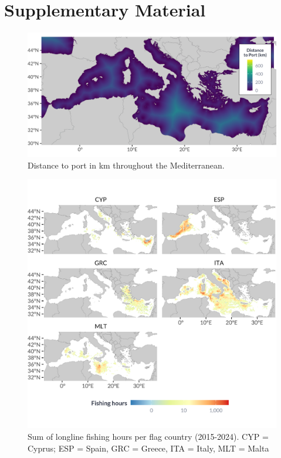 \chapter{Supplementary Material}

\begin{figure}[H]
	\centering
	\includegraphics[width=1\linewidth, trim=0 0 0 0,clip]{Figures/plots/dist_med.pdf}
	\caption{Distance to port in km throughout the Mediterranean. }
	\label{fig:distance}
\end{figure}

\begin{figure}[H]
	\centering
	\includegraphics[width=1\linewidth, trim=0 1.2cm 0 1.2cm,clip]{Figures/plots/longline_countries.pdf}
	\caption{Sum of longline fishing hours per flag country (2015-2024). CYP = Cyprus; ESP = Spain, GRC = Greece, ITA = Italy, MLT = Malta}
	\label{fig:longline_effort_countries}
\end{figure}

